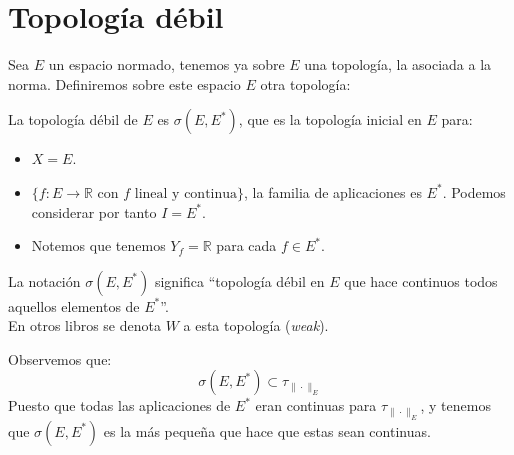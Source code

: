 \section{Topología débil}
\noindent
Sea $E$ un espacio normado, tenemos ya sobre $E$ una topología, la asociada a la norma. Definiremos sobre este espacio $E$ otra topología:

\noindent
La topología débil de $E$ es $\sigma(E,E^\ast)$, que es la topología inicial en $E$ para:
\begin{itemize}
    \item $X = E$.
    \item $\{f:E\to \mathbb{R} \text{\ con\ } f \text{\ lineal y continua}\}$, la familia de aplicaciones es $E^\ast$. Podemos considerar por tanto $I = E^\ast$.
    \item Notemos que tenemos $Y_f = \mathbb{R}$ para cada $f\in E^\ast$.
\end{itemize}

\begin{notacion}
    La notación $\sigma(E,E^\ast)$ significa ``topología débil en $E$ que hace continuos todos aquellos elementos de $E^\ast$''.\\

    \noindent
    En otros libros se denota $W$ a esta topología (\textit{weak}).
\end{notacion}

\begin{observacion}
    Observemos que:
    \begin{equation*}
        \sigma(E,E^\ast) \subset \tau_{\|\cdot \|_E}
    \end{equation*}
    Puesto que todas las aplicaciones de $E^\ast$ eran continuas para $\tau_{\|\cdot \|_E}$, y tenemos que $\sigma(E,E^\ast)$ es la más pequeña que hace que estas sean continuas.
\end{observacion}

